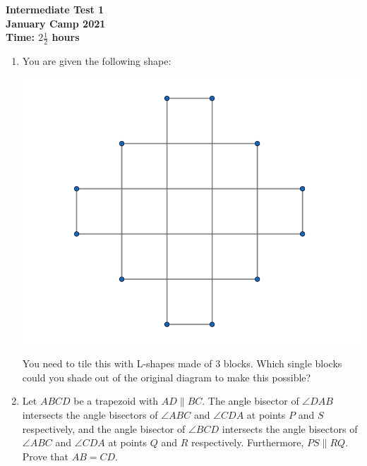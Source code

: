 \documentclass{article}
\begin{document}
\thispagestyle{empty}

\begin{center}
  \textbf{\Large Intermediate Test 1}
  \\ \vspace{1em}
  \textbf{\large January Camp 2021}
  \\ \vspace{1em}
  \textbf{\large Time: $2\frac{1}{2}$ hours}
\end{center}

\vspace{24pt}

\begin{enumerate}[1.]

\item You are given the following shape: %
	\begin{center}
	\includegraphics[scale=0.3]{Capture.png}	
	\end{center}
You need to tile this with L-shapes made of 3 blocks. Which single blocks could you shade out of the original diagram to make this possible?


\item %
Let $ABCD$ be a trapezoid with $AD \parallel BC$. The angle bisector of $\angle DAB$ intersects the angle bisectors of $\angle ABC$ and $\angle CDA$ at points $P$ and $S$ respectively, and the angle bisector of $\angle BCD$ intersects the angle bisectors of $\angle ABC$ and $\angle CDA$ at points $Q$ and $R$ respectively. Furthermore, $PS \parallel RQ$. Prove that $AB = CD$.



\end{enumerate}
\end{document}

